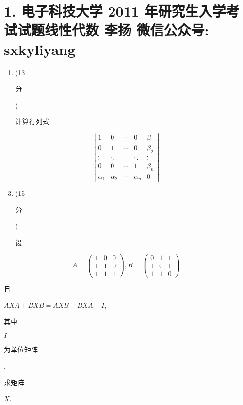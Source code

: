 \documentclass[10pt]{article}
\begin{document}
\section{1. 电子科技大学 2011 年研究生入学考试试题线性代数 
 李扬 
 微信公众号: sxkyliyang}
\begin{enumerate}
  \item (13 \begin{CJK}{UTF8}{mj}分\end{CJK}) \begin{CJK}{UTF8}{mj}计算行列式\end{CJK}
\end{enumerate}
$$
\left|\begin{array}{ccccc}
1 & 0 & \cdots & 0 & \beta_{1} \\
0 & 1 & \cdots & 0 & \beta_{2} \\
\vdots & \ddots & & \ddots & \vdots \\
0 & 0 & \cdots & 1 & \beta_{n} \\
\alpha_{1} & \alpha_{2} & \cdots & \alpha_{n} & 0
\end{array}\right|
$$

\begin{enumerate}
  \setcounter{enumi}{2}
  \item (15 \begin{CJK}{UTF8}{mj}分\end{CJK}) \begin{CJK}{UTF8}{mj}设\end{CJK}
\end{enumerate}
$$
A=\left(\begin{array}{lll}
1 & 0 & 0 \\
1 & 1 & 0 \\
1 & 1 & 1
\end{array}\right), B=\left(\begin{array}{lll}
0 & 1 & 1 \\
1 & 0 & 1 \\
1 & 1 & 0
\end{array}\right)
$$
\begin{CJK}{UTF8}{mj}且\end{CJK} $A X A+B X B=A X B+B X A+I$, \begin{CJK}{UTF8}{mj}其中\end{CJK} $I$ \begin{CJK}{UTF8}{mj}为单位矩阵\end{CJK}, \begin{CJK}{UTF8}{mj}求矩阵\end{CJK} $X$.
\end{document}
